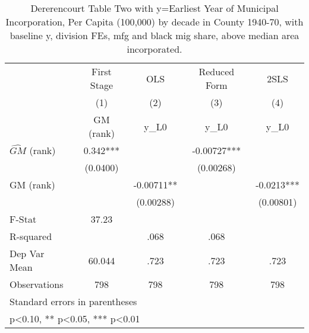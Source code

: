 \begin{table}[htbp]\centering
\def\sym#1{\ifmmode^{#1}\else\(^{#1}\)\fi}
\caption{Dererencourt Table Two with y=Earliest Year of Municipal Incorporation, Per Capita (100,000) by decade in County 1940-70, with baseline y, division FEs, mfg and black mig share, above median area incorporated.}
\begin{tabular}{l*{4}{c}}
\toprule
                    & First Stage   &         OLS   &Reduced Form   &        2SLS   \\
                    &\multicolumn{1}{c}{(1)}&\multicolumn{1}{c}{(2)}&\multicolumn{1}{c}{(3)}&\multicolumn{1}{c}{(4)}\\
                    &\multicolumn{1}{c}{GM  (rank)}&\multicolumn{1}{c}{y\_L0}&\multicolumn{1}{c}{y\_L0}&\multicolumn{1}{c}{y\_L0}\\
\midrule
$\hat{GM}$ (rank)   &       0.342***&               &    -0.00727***&               \\
                    &    (0.0400)   &               &   (0.00268)   &               \\
\addlinespace
GM  (rank)          &               &    -0.00711** &               &     -0.0213***\\
                    &               &   (0.00288)   &               &   (0.00801)   \\
\midrule
F-Stat              &       37.23   &               &               &               \\
R-squared           &               &        .068   &        .068   &               \\
Dep Var Mean        &      60.044   &        .723   &        .723   &        .723   \\
Observations        &         798   &         798   &         798   &         798   \\
\bottomrule
\multicolumn{5}{l}{\footnotesize Standard errors in parentheses}\\
\multicolumn{5}{l}{\footnotesize * p<0.10, ** p<0.05, *** p<0.01}\\
\end{tabular}
\end{table}
